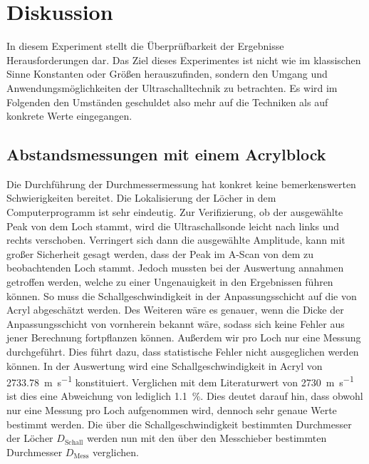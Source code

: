 %

%
\section{Diskussion}
\label{sec:Diskussion}

In diesem Experiment stellt die Überprüfbarkeit der Ergebnisse Herausforderungen dar. 
Das Ziel dieses Experimentes ist nicht wie im klassischen Sinne Konstanten oder Größen 
herauszufinden, sondern den Umgang und Anwendungsmöglichkeiten der Ultraschalltechnik 
zu betrachten. Es wird im Folgenden den Umständen geschuldet also mehr auf die 
Techniken als auf konkrete Werte eingegangen. 

\subsection{Abstandsmessungen mit einem Acrylblock}
Die Durchführung der Durchmessermessung hat konkret keine bemerkenswerten Schwierigkeiten 
bereitet. Die Lokalisierung der Löcher in dem Computerprogramm ist sehr eindeutig. Zur 
Verifizierung, ob der ausgewählte Peak von dem Loch stammt, wird die Ultraschallsonde 
leicht nach links und rechts verschoben. Verringert sich dann die  ausgewählte Amplitude, 
kann mit großer Sicherheit gesagt werden, dass der Peak im A-Scan von dem zu beobachtenden 
Loch stammt. Jedoch mussten bei der Auswertung annahmen getroffen werden, welche zu einer 
Ungenauigkeit in den Ergebnissen führen können. So muss die Schallgeschwindigkeit in der 
Anpassungsschicht auf die von Acryl abgeschätzt werden. Des Weiteren wäre es genauer, wenn 
die Dicke der Anpassungsschicht von vornherein bekannt wäre, sodass sich keine Fehler aus 
jener Berechnung fortpflanzen können. Außerdem wir pro Loch nur eine Messung durchgeführt. 
Dies führt dazu, dass statistische Fehler nicht ausgeglichen werden können. In der Auswertung 
wird eine Schallgeschwindigkeit in Acryl von \qty{2733,78}{\meter \per \second} konstituiert. 
Verglichen mit dem Literaturwert von \qty{2730}{\meter\per\second} \cite{SchallgeschwindigkeitII} ist dies eine Abweichung 
von lediglich \qty{1,1}{\percent}. Dies deutet darauf hin, dass obwohl nur eine Messung pro 
Loch aufgenommen wird, dennoch sehr genaue Werte bestimmt werden. Die über die 
Schallgeschwindigkeit bestimmten Durchmesser der Löcher $D_\text{Schall}$ werden nun mit den 
über den Messchieber bestimmten Durchmesser $D_\text{Mess}$ verglichen.

